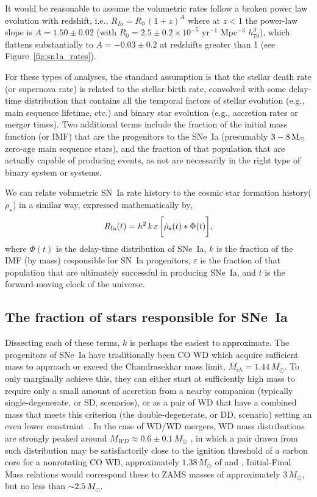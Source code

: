 \documentclass[apj]{aastex}
\begin{document}
It would be reasonable to assume the volumetric rates follow a broken power law evolution with redshift, i.e., $R_{Ia}=R_0\,(1+z)^A$ where at $z<1$ the power-law slope is $A=1.50\pm0.02$ (with $R_0 = 2.5\pm0.2\times10^{-5}$ yr$^{-1}$ Mpc$^{-3}$ $h_{70}^3$), which flattens substantially to $A=-0.03\pm0.2$ at redshifts greater than 1 (see Figure~\ref{fig:sn1a_rates}). 

For these types of analyses, the standard assumption is that the stellar death rate (or supernova rate) is related to the stellar birth rate, convolved with some delay-time distribution that contains all the temporal factors of stellar evolution (e.g., main sequence lifetime, etc.) and binary star evolution (e.g., accretion rates or merger times). Two additional terms include the fraction of the initial mass function (or IMF) that are the progenitors to the SNe~Ia (presumably $3 - 8\, \rm{M}_{\odot}$ zero-age main sequence stars), and the fraction of that population that are actually capable of producing events, as not are necessarily in the right type of binary system or systems.

We can relate volumetric SN~Ia rate history to the cosmic star formation history($\dot{\rho}_{\star}$) in a similar way, expressed mathematically by, 
\begin{equation}
R_{\rm Ia}(t) =  h^2\,k\,\varepsilon\,\biggl[\dot{\rho}_{\star}(t) \ast \Phi(t)\biggr],
\label{eqn:std}
\end{equation}
\noindent where $\Phi(t)$ is the delay-time distribution of SNe~Ia, $k$ is the fraction of the IMF (by mass) responsible for SN~Ia progenitors, $\varepsilon$ is the fraction of that population that are ultimately successful in producing SNe~Ia, and $t$ is the forward-moving clock of the universe. 

\subsection{The fraction of stars responsible for SNe~Ia}
Dissecting each of these terms, $k$ is perhaps the easiest to approximate. The progenitors of SNe~Ia have traditionally been CO WD which acquire sufficient mass to approach or exceed the Chandrasekhar mass limit, $M_{ch}=1.44\,M_{\odot}$. To only marginally achieve this, they can either start at sufficiently high mass to require only a small amount of accretion from a nearby companion (typically single-degenerate, or SD, scenarios), or as a pair of WD that have a combined mass that meets this criterion (the double-degenerate, or DD, scenario) setting an even lower constraint~\cite[see][for a review]{Maoz:2013}. In the case of WD/WD mergers, WD mass distributions are strongly peaked around $M_{WD}\approx0.6\pm0.1\,M_{\odot}$ \citep{Catalan:2008il}, in which a pair drawn from such distribution may be satisfactorily close to the ignition threshold of a carbon core for a nonrotating CO WD, approximately $1.38\, M_{\odot}$ of \cite{Arnett:1969dw} and \cite{Nomoto:1982vh}. Initial-Final Mass relations \cite[e.g.,][]{Catalan:2008il,Cummings:2018oe} would correspond these to ZAMS masses of approximately $3\, M_{\odot}$, but no less than $\sim2.5\, M_{\odot}$. 
\end{document}
